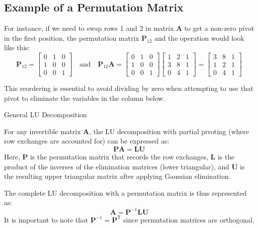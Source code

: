 \subsection*{Example of a Permutation Matrix}

For instance, if we need to swap rows 1 and 2 in matrix \( \mathbf{A} \) to get a non-zero pivot in the first position, the permutation matrix \( \mathbf{P}_{12} \) and the operation would look like this:
\[
\mathbf{P}_{12} =
\begin{bmatrix}
    0 & 1 & 0 \\
    1 & 0 & 0 \\
    0 & 0 & 1
\end{bmatrix}
\quad \text{and} \quad
\mathbf{P}_{12}\mathbf{A} =
\begin{bmatrix}
    0 & 1 & 0 \\
    1 & 0 & 0 \\
    0 & 0 & 1
\end{bmatrix}
\begin{bmatrix}
    1 & 2 & 1 \\
    3 & 8 & 1 \\
    0 & 4 & 1
\end{bmatrix}
=
\begin{bmatrix}
    3 & 8 & 1 \\
    1 & 2 & 1 \\
    0 & 4 & 1
\end{bmatrix}
\]

This reordering is essential to avoid dividing by zero when attempting to use that pivot to eliminate the variables in the column below.

\begin{definitionbox}{General LU Decomposition}

For any invertible matrix \( \mathbf{A} \), the LU decomposition with partial pivoting (where row exchanges are accounted for) can be expressed as:
\[
\mathbf{PA} = \mathbf{LU}
\]
Here, \( \mathbf{P} \) is the permutation matrix that records the row exchanges, \( \mathbf{L} \) is the product of the inverses of the elimination matrices (lower triangular), and \( \mathbf{U} \) is the resulting upper triangular matrix after applying Gaussian elimination.


The complete LU decomposition with a permutation matrix is thus represented as:
\[
\mathbf{A} = \mathbf{P}^{-1}\mathbf{L}\mathbf{U}
\]
It is important to note that \( \mathbf{P}^{-1} = \mathbf{P}^\mathsf{T} \) since permutation matrices are orthogonal.

\end{definitionbox}


